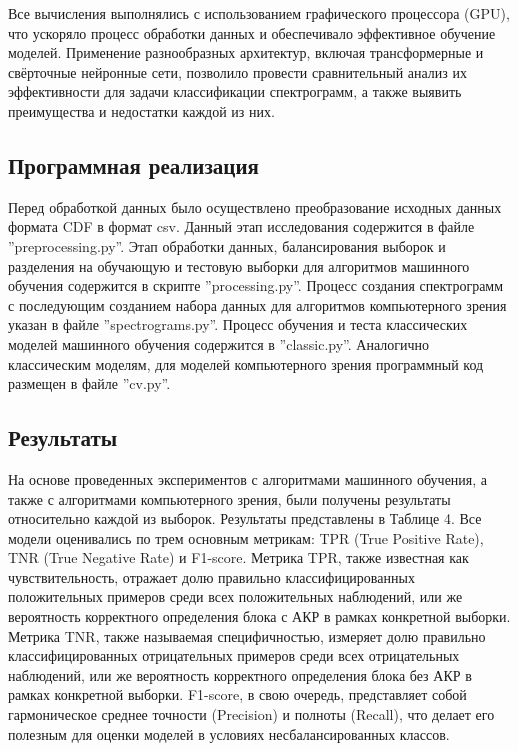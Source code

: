 \documentclass[spec, och, diploma]{SCWorks}
\begin{document}
        Все вычисления выполнялись с использованием графического процессора
        (GPU), что ускоряло процесс обработки данных и обеспечивало эффективное
        обучение моделей. Применение разнообразных архитектур, включая
        трансформерные и свёрточные нейронные сети, позволило провести
        сравнительный анализ их эффективности для задачи классификации
        спектрограмм, а также выявить преимущества и недостатки каждой из них.

    \subsection{Программная реализация}

        Перед обработкой данных было осуществлено преобразование исходных данных
        формата CDF в формат csv. Данный этап исследования содержится в файле
        ''preprocessing.py''. Этап обработки данных, балансирования выборок и
        разделения на обучающую и тестовую выборки для алгоритмов машинного
        обучения содержится в скрипте ''processing.py''. Процесс создания
        спектрограмм с последующим созданием набора данных для алгоритмов
        компьютерного зрения указан в файле ''spectrograms.py''. Процесс
        обучения и теста классических моделей машинного обучения содержится в
        ''classic.py''. Аналогично классическим моделям, для моделей
        компьютерного зрения программный код размещен в файле ''cv.py''.

    \subsection{Результаты}

        На основе проведенных экспериментов с алгоритмами машинного обучения, а
        также с алгоритмами компьютерного зрения, были получены результаты
        относительно каждой из выборок. Результаты представлены в Таблице 4. Все
        модели оценивались по трем основным метрикам: TPR (True Positive Rate),
        TNR (True Negative Rate) и F1-score. Метрика TPR, также известная как
        чувствительность, отражает долю правильно классифицированных
        положительных примеров среди всех положительных наблюдений, или же
        вероятность корректного определения блока с АКР в рамках конкретной
        выборки. Метрика TNR, также называемая специфичностью, измеряет долю
        правильно классифицированных отрицательных примеров среди всех
        отрицательных наблюдений, или же вероятность корректного определения
        блока без АКР в рамках конкретной выборки. F1-score, в свою очередь,
        представляет собой гармоническое среднее точности (Precision) и полноты
        (Recall), что делает его полезным для оценки моделей в условиях
        несбалансированных классов.
\end{document}
